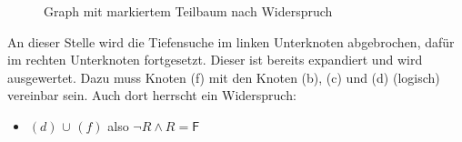 \begin{figure}[htbp]
    \centering
    \caption{Graph mit markiertem Teilbaum nach Widerspruch}
\end{figure}

An dieser Stelle wird die Tiefensuche im linken Unterknoten abgebrochen, dafür im rechten Unterknoten fortgesetzt. Dieser ist bereits expandiert und wird ausgewertet. Dazu muss Knoten (f) mit den Knoten (b), (c) und (d) (logisch) vereinbar sein. Auch dort herrscht ein Widerspruch:
\begin{itemize}
    \item $(d)$ \textcircled{$\cup$} $(f)$ also $\neg R \wedge R = \mathsf{F}$
\end{itemize}

